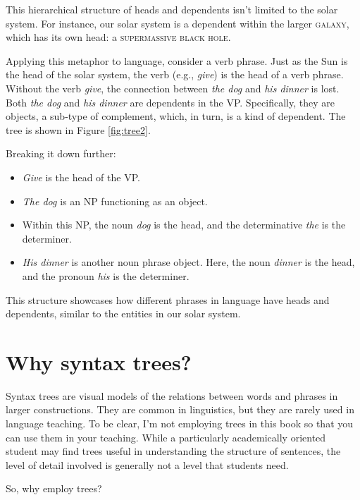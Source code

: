 This hierarchical structure of heads and dependents isn't limited to the solar system. For instance, our solar system is a dependent within the larger \textsc{galaxy}, which has its own head: a \textsc{supermassive black hole}.

Applying this metaphor to language, consider a verb phrase. Just as the Sun is the head of the solar system, the verb (e.g., \textit{give}) is the head of a verb phrase. Without the verb \textit{give}, the connection between \textit{the dog} and \textit{his dinner} is lost. Both \textit{the dog} and \textit{his dinner} are dependents in the VP. Specifically, they are objects, a sub-type of complement, which, in turn, is a kind of dependent. The tree is shown in Figure \ref{fig:tree2}.


Breaking it down further:
\begin{itemize}[noitemsep]
    \item \textit{Give} is the head of the VP.
    \item \textit{The dog} is an NP functioning as an object. 
    \item Within this NP, the noun \textit{dog} is the head, and the determinative \textit{the} is the determiner.
    \item \textit{His dinner} is another noun phrase object. Here, the noun \textit{dinner} is the head, and the pronoun \textit{his} is the determiner.
\end{itemize}

This structure showcases how different phrases in language have heads and dependents, similar to the entities in our solar system.

\section{Why syntax trees?} \label{sec:why-trees}

Syntax trees are visual models of the relations between words and phrases in larger constructions. They are common in linguistics, but they are rarely used in language teaching. To be clear, I'm not employing trees in this book so that you can use them in your teaching. While a particularly academically oriented student may find trees useful in understanding the structure of sentences, the level of detail involved is generally not a level that students need.

So, why employ trees?


